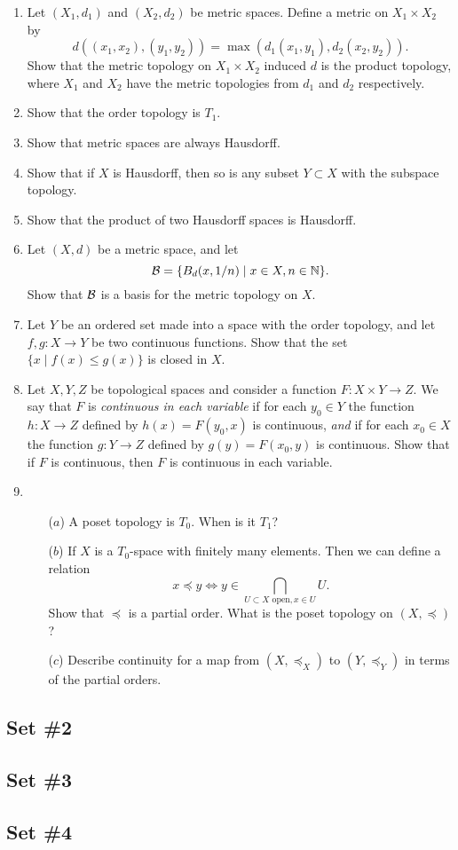 \begin{enumerate}
  	\item Let $(X_1,d_1)$ and $(X_2,d_2)$ be metric spaces. Define a metric on $X_1 \times X_2$ by
	  \[
	    d((x_1,x_2),(y_1,y_2)) = \max(d_1(x_1,y_1),d_2(x_2,y_2)).
	  \]
    Show that the metric topology on $X_1 \times X_2$ induced $d$ is the product topology, where $X_1$ and $X_2$ have the metric topologies from $d_1$ and $d_2$ respectively.
  
  \item Show that the order topology is $T_1$.
  
  \item \label{metric-Hausdorff} Show that metric spaces are always Hausdorff.
  
  \item Show that if $X$ is Hausdorff, then so is any subset $Y\subset X$ with the subspace topology.
  
  \item Show that the product of two Hausdorff spaces is Hausdorff.
  
  \item Let $(X,d)$ be a metric space, and let
  \[
    \mathcal{B} = \{ B_d(x,1/n) \mid x \in X, n \in \mathbb{N} \}.
  \]
  Show that $\mathcal{B}$ is a basis for the metric topology on $X$.
  
  \item Let $Y$ be an ordered set made into a space with the order topology, and let $f,g:X\to Y$ be two continuous functions. Show that the set $\{x \mid f(x)\leq g(x)\}$ is closed in $X$.
  
  \item Let $X,Y,Z$ be topological spaces and consider a function $F:X\times Y\rightarrow Z$. We say that $F$ is \emph{continuous in each variable} if for each $y_0\in Y$ the function $h:X\rightarrow Z$ defined by $h(x)=F(y_0,x)$ is continuous, \emph{and} if for each $x_0\in X$ the function $g:Y\rightarrow Z$ defined by $g(y) = F(x_0,y)$ is continuous. Show that if $F$ is continuous, then $F$ is continuous in each variable.
  
  \item \begin{itemize}
		\item[($a$)] A poset topology is $T_0$. When is it $T_1$?
		\item[($b$)] If $X$ is a $T_0$-space with finitely many elements. Then we can define a relation
		\[x\preceq y \Leftrightarrow y\in \bigcap_{U\subset X\text{ open}, x\in U} U.\]
		Show that $\preceq$ is a partial order. What is the poset topology on $(X,\preceq)$?
		\item[($c$)] Describe continuity for a map from $(X,\preceq_X)$ to $(Y,\preceq_Y)$ in terms of the partial orders.
	\end{itemize}
  
\end{enumerate}

\subsection{Set \#2}

\subsection{Set \#3}

\subsection{Set \#4}
